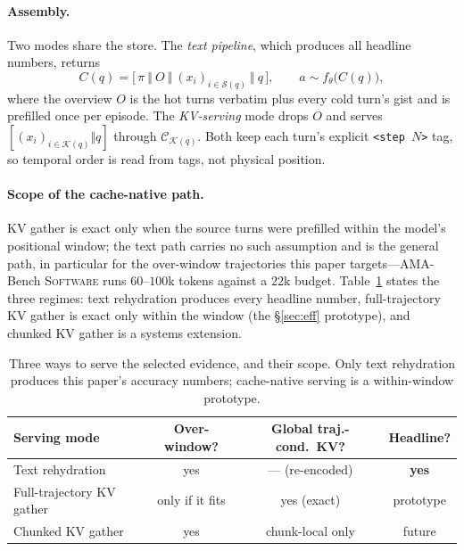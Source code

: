 \documentclass{article} %
\begin{document}
\paragraph{Assembly.} Two modes share the store. The \emph{text pipeline}, which
produces all headline numbers, returns
\[
  C(q)=\big[\,\pi\ \Vert\ O\ \Vert\ (x_i)_{i\in\mathcal{S}(q)}\ \Vert\ q\,\big],
  \qquad a\sim f_\theta\big(C(q)\big),
\]
where the overview $O$ is the hot turns verbatim plus every cold turn's gist and
is prefilled once per episode. The \emph{KV-serving} mode drops $O$ and serves
$[(x_i)_{i\in\mathcal{K}(q)}\Vert q]$ through $\mathcal{C}_{\mathcal{K}(q)}$. Both
keep each turn's explicit \texttt{<step $N$>} tag, so temporal order is read from
tags, not physical position.

\paragraph{Scope of the cache-native path.} KV gather is exact only when the source
turns were prefilled within the model's positional window; the text path carries no
such assumption and is the general path, in particular for the over-window
trajectories this paper targets---AMA-Bench \textsc{Software} runs $60$--$100$k tokens
against a $22$k budget. Table~\ref{tab:modes} states the three regimes: text
rehydration produces every headline number, full-trajectory KV gather is exact only
within the window (the \S\ref{sec:eff} prototype), and chunked KV gather is a systems
extension.

\begin{table}[h]
\centering
\caption{Three ways to serve the selected evidence, and their scope. Only text
rehydration produces this paper's accuracy numbers; cache-native serving is a
within-window prototype.}
\label{tab:modes}
\small
\setlength{\tabcolsep}{5pt}
\begin{tabular}{lccc}
\toprule
Serving mode & Over-window? & Global traj.-cond.\ KV? & Headline? \\
\midrule
Text rehydration & yes & --- (re-encoded) & \textbf{yes} \\
Full-trajectory KV gather & only if it fits & yes (exact) & prototype \\
Chunked KV gather & yes & chunk-local only & future \\
\bottomrule
\end{tabular}
\end{table}
\end{document}
